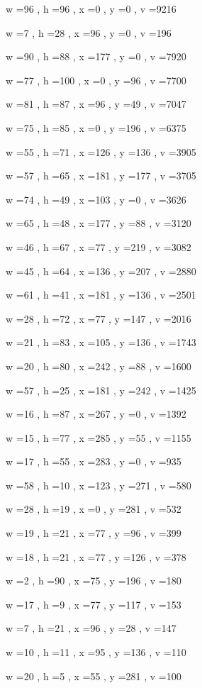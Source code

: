 \documentclass[11pt]{article}
\begin{document}
w =96 , h =96 , x =0 , y =0 , v =9216
\par
w =7 , h =28 , x =96 , y =0 , v =196
\par
w =90 , h =88 , x =177 , y =0 , v =7920
\par
w =77 , h =100 , x =0 , y =96 , v =7700
\par
w =81 , h =87 , x =96 , y =49 , v =7047
\par
w =75 , h =85 , x =0 , y =196 , v =6375
\par
w =55 , h =71 , x =126 , y =136 , v =3905
\par
w =57 , h =65 , x =181 , y =177 , v =3705
\par
w =74 , h =49 , x =103 , y =0 , v =3626
\par
w =65 , h =48 , x =177 , y =88 , v =3120
\par
w =46 , h =67 , x =77 , y =219 , v =3082
\par
w =45 , h =64 , x =136 , y =207 , v =2880
\par
w =61 , h =41 , x =181 , y =136 , v =2501
\par
w =28 , h =72 , x =77 , y =147 , v =2016
\par
w =21 , h =83 , x =105 , y =136 , v =1743
\par
w =20 , h =80 , x =242 , y =88 , v =1600
\par
w =57 , h =25 , x =181 , y =242 , v =1425
\par
w =16 , h =87 , x =267 , y =0 , v =1392
\par
w =15 , h =77 , x =285 , y =55 , v =1155
\par
w =17 , h =55 , x =283 , y =0 , v =935
\par
w =58 , h =10 , x =123 , y =271 , v =580
\par
w =28 , h =19 , x =0 , y =281 , v =532
\par
w =19 , h =21 , x =77 , y =96 , v =399
\par
w =18 , h =21 , x =77 , y =126 , v =378
\par
w =2 , h =90 , x =75 , y =196 , v =180
\par
w =17 , h =9 , x =77 , y =117 , v =153
\par
w =7 , h =21 , x =96 , y =28 , v =147
\par
w =10 , h =11 , x =95 , y =136 , v =110
\par
w =20 , h =5 , x =55 , y =281 , v =100
\par
\newpage
\end{document}
